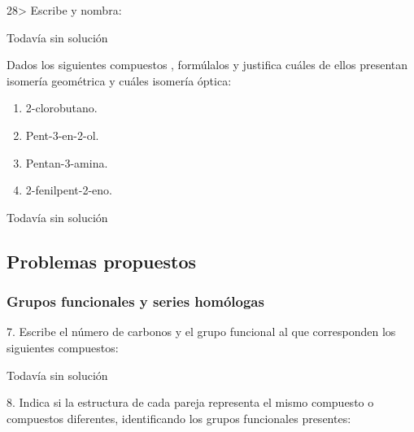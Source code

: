 \documentclass{article}
\begin{document}
\begin{exercise}
  28> Escribe y nombra:
\end{exercise}

\begin{solution}[print=false]
  Todavía sin solución
\end{solution}

\begin{exercise}
  Dados los siguientes compuestos , formúlalos y justifica cuáles
  de ellos presentan isomería geométrica y cuáles isomería
  óptica:
  \begin{enumerate}
    \item 2-clorobutano.
    \item Pent-3-en-2-ol.
    \item Pentan-3-amina.
    \item 2-fenilpent-2-eno.
  \end{enumerate}
\end{exercise}

\begin{solution}[print=false]
  Todavía sin solución
\end{solution}

\subsection{Problemas propuestos}

\subsubsection{Grupos funcionales y series homólogas}

\begin{exercise}
  7. Escribe el número de carbonos y el grupo funcional al que
  corresponden los siguientes compuestos:
\end{exercise}

\begin{solution}[print=false]
  Todavía sin solución
\end{solution}

\begin{exercise}
  8. Indica si la estructura de cada pareja representa el mismo
  compuesto o compuestos diferentes, identificando los grupos
  funcionales presentes:
\end{exercise}
\end{document}
